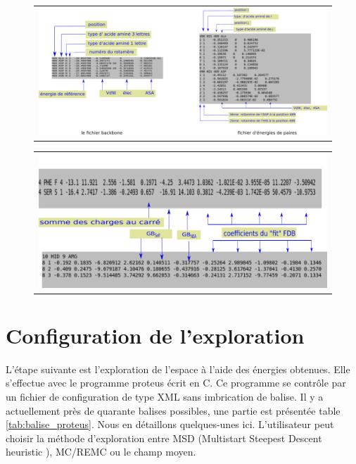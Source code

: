    \begin{figure}[!htbp]
     \centering
     \begin{tabular}{c}
       \includegraphics[width=16cm]{figure/inputener.png} 
     \end{tabular}     
     \caption{}
\label{fig:CAenerfile}
   \end{figure}


   \begin{figure}[!htbp]
     \centering
     \begin{tabular}{c}
       \includegraphics[width=14cm]{figure/inputenerGB.png} 
     \end{tabular}     
     \caption{}
\label{fig:GBenerfile}
   \end{figure}
   
\section{Configuration de l'exploration}
L'étape suivante est l'exploration de l'espace à l'aide des énergies obtenues. Elle s'effectue avec le programme proteus écrit en C. Ce programme se contrôle par un fichier de configuration de type XML sans imbrication de balise. Il y a actuellement près de quarante balises possibles, une partie est présentée table \vref{tab:balise_proteus}. Nous en détaillons quelques-unes ici. L'utilisateur peut choisir la méthode d'exploration entre MSD (\og Multistart Steepest Descent heuristic \fg), MC/REMC ou le champ moyen.

